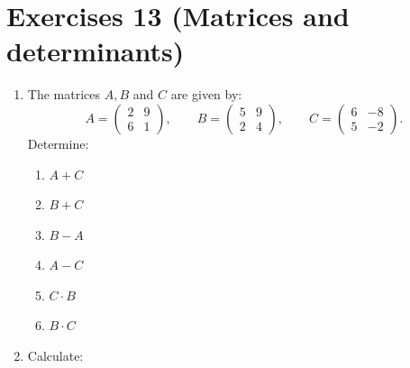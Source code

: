 \documentclass[
  english,
  12pt,
  oneside]{book}
\providecommand{\tightlist}{%
  \setlength{\itemsep}{0pt}\setlength{\parskip}{0pt}}
\theoremstyle{definition}
\theoremstyle{definition}
\theoremstyle{definition}
\theoremstyle{definition}
\theoremstyle{remark}
\begin{document}
\chapter*{Exercises 13 (Matrices and determinants)}\label{exercises-13-matrices-and-determinants}

\begin{enumerate}
\def\labelenumi{\arabic{enumi}.}
\item
  The matrices \(A,B\) and \(C\) are given by:
  \[A=\begin{pmatrix}2&9\\6&1\end{pmatrix},\qquad B=\begin{pmatrix}5&9\\2&4\end{pmatrix},\qquad C=\begin{pmatrix}6&-8\\5&-2\end{pmatrix}.\]
  Determine:

  \begin{enumerate}
  \def\labelenumii{\roman{enumii})}
  \tightlist
  \item
    \(A+C\)
  \item
    \(B+C\)
  \item
    \(B-A\)
  \item
    \(A-C\)
  \item
    \(C\cdot B\)
  \item
    \(B\cdot C\)
  \end{enumerate}
\item
  Calculate:


\end{enumerate}
\end{document}
